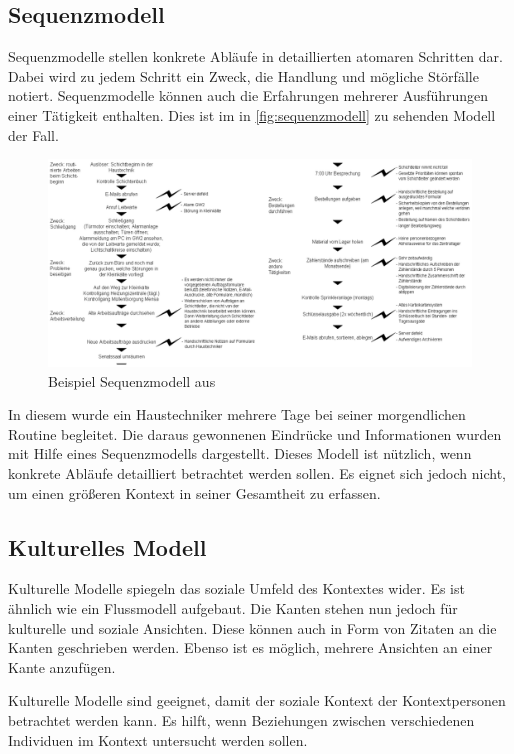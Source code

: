 \subsection{Sequenzmodell}

Sequenzmodelle stellen konkrete Abläufe in detaillierten atomaren Schritten dar.
Dabei wird zu jedem Schritt ein Zweck, die Handlung und mögliche Störfälle notiert.
Sequenzmodelle können auch die Erfahrungen mehrerer Ausführungen einer Tätigkeit enthalten.
Dies ist im in \autoref{fig:sequenzmodell} zu sehenden Modell der Fall.

\begin{figure}[htp]
    \centering
    \includegraphics[width=\textwidth]{images/3-Modelle/sequenzmodell.png}
    \caption{Beispiel Sequenzmodell aus \cite{NOG}}
    \label{fig:sequenzmodell}
\end{figure}

In diesem wurde ein Haustechniker mehrere Tage bei seiner morgendlichen Routine begleitet.
Die daraus gewonnenen Eindrücke und Informationen wurden mit Hilfe eines Sequenzmodells dargestellt.
Dieses Modell ist nützlich, wenn konkrete Abläufe detailliert betrachtet werden sollen.
Es eignet sich jedoch nicht, um einen größeren Kontext in seiner Gesamtheit zu erfassen.

\subsection{Kulturelles Modell}

Kulturelle Modelle spiegeln das soziale Umfeld des Kontextes wider.
Es ist ähnlich wie ein Flussmodell aufgebaut.
Die Kanten stehen nun jedoch für kulturelle und soziale Ansichten.
Diese können auch in Form von Zitaten an die Kanten geschrieben werden.
Ebenso ist es möglich, mehrere Ansichten an einer Kante anzufügen.

Kulturelle Modelle sind geeignet, damit der soziale Kontext der Kontextpersonen betrachtet werden kann.
Es hilft, wenn Beziehungen zwischen verschiedenen Individuen im Kontext untersucht werden sollen.

